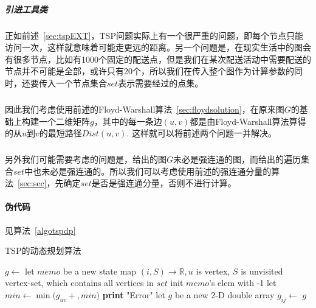 \documentclass[UTF8,a4paper]{ctexart}
\begin{document}
\subparagraph{引进工具类}正如前述~\ref{sec:tspEXT}，TSP问题实际上有一个很严重的问题，即每个节点只能访问一次，这样就意味着可能走更远的距离。另一个问题是，在现实生活中的图会有很多节点，比如有1000个固定的配送点，但是我们在某次配送活动中需要配送的节点并不可能是全部，或许只有20个，所以我们在传入整个图作为计算参数的同时，还要传入一个节点集合$set$表示需要经过的点集。
\subparagraph{}因此我们考虑使用前述的Floyd-Warshall算法~\ref{sec:floydsolution}，在原来图$G$的基础上构建一个二维矩阵$g$，其中的每一条边$(u,v)$都是由Floyd-Warshall算法算得的从$u$到$v$的最短路径$Dist(u,v)$. 这样就可以将前述两个问题一并解决。
\subparagraph{}另外我们可能需要考虑的问题是，给出的图$G$未必是强连通的图，而给出的遍历集合$set$中也未必是强连通的。所以我们可以考虑使用前述的强连通分量的算法~\ref{sec:scc}，先确定$set$是否是强连通分量，否则不进行计算。

\paragraph{伪代码}见算法~\ref{algotspdp}~\cite{held1962dynamic}
\begin{algorithm}
    \caption{TSP的动态规划算法}\label{algotspdp}
    \begin{algorithmic}[1] %
        \State $g\gets$
        \State let {$memo$} be a new state map {$(i,S)\to \mathbb{R},u$ is vertex, $S$ is unvisited vertex-set, which contains all vertices in $set$} init $memo$'s elem with -1
        \EndFor
        \EndFunction
        \State
        \State {}
        \EndIf
        \State let {$min \gets \min(g_{uv}+$$,min)$}
        \EndFor
        \State {}
        \EndFunction
        \State
        \State {}
        \State \textbf{print} "Error"
        \State \Return
        \EndIf
        \State let {$g$} be a new 2-D double array
        \State {}
        \State $g_{ij}\gets $
        \EndFor
        \EndFor
        \State \Return $g$
        \EndFunction
    \end{algorithmic}
\end{algorithm}
\end{document}
